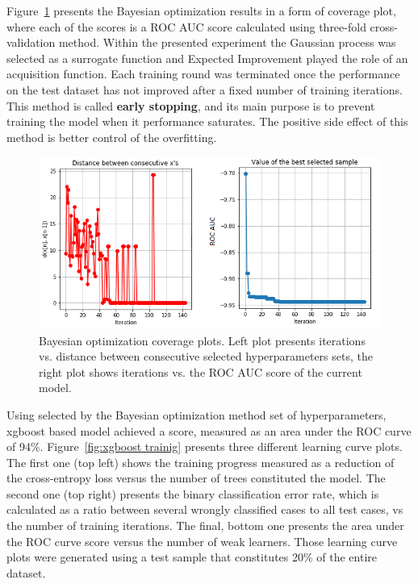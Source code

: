 Figure~\ref{fig:hyperparameter_xgboost} presents the Bayesian optimization results in a form of coverage plot, where each of the scores is a ROC AUC score calculated using three-fold cross-validation method. Within the presented experiment the Gaussian process was selected as a surrogate function and Expected Improvement played the role of an acquisition function. Each training round was terminated once the performance on the test dataset has not improved after a fixed number of training iterations. This method is called \textbf{early stopping}, and its main purpose is to prevent training the model when it performance saturates. The positive side effect of this method is better control of the overfitting. 



\begin{figure}
\centering
\hspace*{-1cm}\includegraphics{figures/GaussianOptXgboost.png}
\caption{Bayesian optimization coverage plots. Left plot presents iterations vs. distance between consecutive selected hyperparameters sets, the right plot shows iterations vs. the ROC AUC score of the current model.}
\label{fig:hyperparameter_xgboost}
\end{figure}

Using selected by the Bayesian optimization method set of hyperparameters, xgboost based model achieved a score, measured as an area under the ROC curve of 94\%. Figure~\ref{fig:xgboost trainig} presents three different learning curve plots. The first one (top left) shows the training progress measured as a reduction of the cross-entropy loss versus the number of trees constituted the model. The second one (top right) presents the binary classification error rate, which is calculated as a ratio between several wrongly classified cases to all test cases, vs the number of training iterations. The final, bottom one presents the area under the ROC curve score versus the number of weak learners. Those learning curve plots were generated using a test sample that constitutes 20\% of the entire dataset. 


